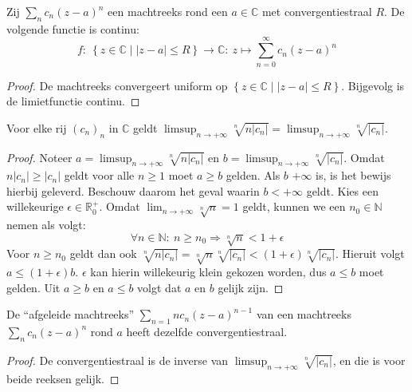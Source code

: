 \documentclass[main.tex]{subfiles}
\begin{document}
\begin{bgev}
  Zij $\sum_{n}c_{n}(z-a)^{n}$ een machtreeks rond een $a\in \mathbb{C}$ met convergentiestraal $R$.
  De volgende functie is continu:
  \[ f:\ \left\{ z \in \mathbb{C} \mid |z-a| \le R \right\} \rightarrow \mathbb{C}:\ z \mapsto \sum_{n=0}^{\infty}c_{n}(z-a)^{n}  \]

  \begin{proof}
    De machtreeks convergeert uniform op $\left\{ z \in \mathbb{C} \mid |z-a| \le R \right\}$.
    Bijgevolg is de limietfunctie continu.
  \end{proof}
\end{bgev}

\begin{blem}
  \label{lem:afgeleide-reeks-zelfde-limsup}
  Voor elke rij $(c_{n})_{n}$ in $\mathbb{C}$ geldt $\limsup_{n\rightarrow +\infty}\sqrt[n]{n|c_{n}|} = \limsup_{n\rightarrow +\infty}\sqrt[n]{|c_{n}|}$.

  \begin{proof}
    Noteer $a=\limsup_{n\rightarrow +\infty}\sqrt[n]{n|c_{n}|}$ en $b= \limsup_{n\rightarrow +\infty}\sqrt[n]{|c_{n}|}$.
    Omdat $n|c_{n}| \ge |c_{n}|$ geldt voor alle $n \ge 1$ moet $a\ge b$ gelden.
    Als $b$ $+\infty$ is, is het bewijs hierbij geleverd.
    Beschouw daarom het geval waarin $b < +\infty$ geldt.
    Kies een willekeurige $\epsilon \in \mathbb{R}_{0}^{+}$.
    Omdat $\lim_{n\rightarrow +\infty}\sqrt[n]{n} = 1$ geldt\waarom, kunnen we een $n_{0}\in \mathbb{N}$ nemen als volgt:
    \[ \forall n\in \mathbb{N}:\ n \ge n_{0} \Rightarrow \sqrt[n]{n} < 1+\epsilon \]
    Voor $n\ge n_{0}$ geldt dan ook $\sqrt[n]{n|c_{n}|} = \sqrt[n]{n}\sqrt[n]{|c_{n}|} < (1+\epsilon)\sqrt[n]{|c_{n}|}$.
    Hieruit volgt $a\le (1+\epsilon)b$.
    $\epsilon$ kan hierin willekeurig klein gekozen worden, dus $a\le b$ moet gelden.
    Uit $a\ge b$ en $a \le b$ volgt dat $a$ en $b$ gelijk zijn.
  \end{proof}
\end{blem}

\begin{gev}
  \label{gev:afgeleide-reeks-zelfde-straal}
  De ``afgeleide machtreeks'' $\sum_{n=1}nc_{n}(z-a)^{n-1}$ van een machtreeks $\sum_{n}c_{n}(z-a)^{n}$ rond $a$ heeft dezelfde convergentiestraal.

  \begin{proof}
    De convergentiestraal is de inverse van $\limsup_{n\rightarrow +\infty}\sqrt[n]{|c_{n}|}$, en die is voor beide reeksen gelijk.
  \end{proof}
\end{gev}
\end{document}
